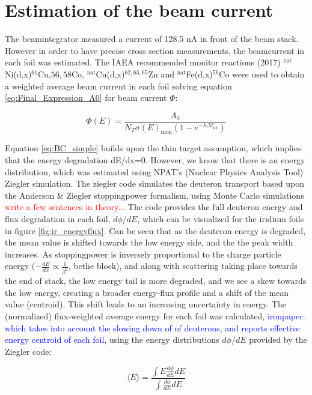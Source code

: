 \documentclass[a4paper,11pt,twoside]{book}
\begin{document}
\section{Estimation of the beam current}
The beamintegrator measured a current of 128.5 nA in front of the beam stack. However in order to have precise cross section measurements, the beamcurrent in each foil was estimated. The IAEA recommended monitor reactions (2017) $^\text{nat}$Ni(d,x)$^{61}$Cu,$56,58$Co, $^\text{nat}$Cu(d,x)$^{62,63,65}$Zn and $^\text{nat}$Fe(d,x)$^{56}$Co were used to obtain a weighted average beam current in each foil solving equation \ref{eq:Final_Expression_A0} for beam current $\Phi$:

\begin{equation} \label{eq:BC_simple}
    \Phi(E) = \frac{A_0}{N_T \sigma(E)_\text{mon}(1-e^{-\lambda \Delta t_\text{irr}})}
\end{equation}

Equation \ref{eq:BC_simple} builds upon the thin target assumption, which implies that the energy degradation dE/dx=0. However, we know that there is an energy distribution, which was estimated using NPAT's (Nuclear Physics Analysis Tool) Ziegler simulation. The ziegler code simulates the deuteron transport based upon the Anderson \& Ziegler stoppingpower formalism, using Monte Carlo simulations \textcolor{red}{write a few sentences in theory..}. The code provides the full deuteron energy and flux degradation in each foil, $d\phi/dE$, which can be visualized for the iridium foils in figure \ref{fig:ir_energyflux}.  Can be seen that as the deuteron energy is degraded, the mean value is shifted towards the low energy side, and the the peak width increases. As stoppingpower is inversely proportional to the charge particle energy ($-\frac{dE}{dx}\propto \frac{1}{\beta^2}$, bethe block), and along with scattering taking place towards the end of stack, the low energy tail is more degraded, and we see a skew towards the low energy, creating a broader energy-flux profile and a shift of the mean value (centroid). This shift leads to an increasing uncertainty in energy. The (normalized) flux-weighted average energy for each foil was calculated, \textcolor{blue}{ironpaper: which takes into account the slowing down of of deuterons, and reports effective energy centroid of each foil}, using the energy distributions $d\phi/dE$ provided by the Ziegler code:

\begin{equation} \label{eq:flux_weighted_average_energy}
    \langle E \rangle = \frac{\int E \frac{d\phi}{dE}dE}{\int \frac{d\phi}{dE}dE}
\end{equation}
\end{document}
